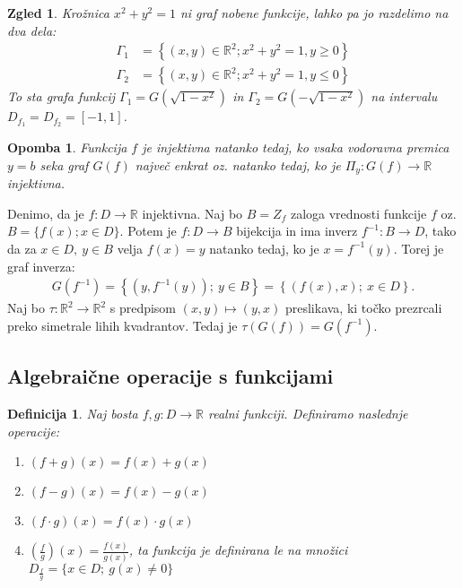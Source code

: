 \documentclass[10pt, a4paper]{article}
\newtheorem{defi}{Definicija}[section]
\newenvironment{noticeB}{%
  \tcolorbox[%
  notitle,
  empty,
  enhanced,  %
  breakable,
  coltext=black,
  colback=white, 
  fontupper=\rmfamily,
  parbox=false,
  noparskip,
  sharp corners,
  boxrule=-1pt,  %
  frame hidden,
  left=7pt,  %
  right=7pt,
  top=5pt,
  bottom=5pt,
  before skip=2.5ex plus 2pt,
  after skip=2.5ex plus 2pt,
  borderline west = {1.5pt}{-0.1pt}{blue!30!black}, %
  overlay unbroken and last={%
    \draw[color=black, line width=1.25pt]
    ($(frame.south west)+(1.pt, -0.1pt)$) -- ++(2em, 0);
  }
  ]}
{\endtcolorbox}
\newenvironment{definicija}{\begin{defi}\begin{noticeB}}{%
    \end{noticeB}\end{defi}}
\newtheorem*{opomba}{Opomba}
\newtheorem{zgled}{Zgled}[section]
\newcommand{\R}{\mathbb {R}}
\begin{document}
\begin{zgled}
    Krožnica $x^2 + y^2 = 1$ ni graf nobene funkcije, lahko pa jo razdelimo na dva dela:
    \begin{align*}
        \Gamma_1 &= \left\lbrace (x,y)\in \R^2; x^2 + y^2 = 1, y \geq 0 \right\rbrace\\
        \Gamma_2 &= \left\lbrace (x,y)\in \R^2; x^2 + y^2 = 1, y \leq 0 \right\rbrace
    \end{align*}
    To sta grafa funkcij $\Gamma_1 = G \left( \sqrt{1-x^2} \right)$ in $\Gamma_2 = G \left( -\sqrt{1-x^2} \right)$ na intervalu $D_{f_1} = D_{f_2} = [-1,1]$.
\end{zgled}

\begin{opomba}
    Funkcija $f$ je injektivna natanko tedaj, ko vsaka vodoravna premica $y=b$ seka graf $G(f)$ največ enkrat oz. natanko tedaj, ko je
    $\Pi_y: G(f) \rightarrow\R$ injektivna.
\end{opomba}

Denimo, da je $f:D \rightarrow \R$ injektivna. Naj bo $B = Z_f$ zaloga vrednosti funkcije $f$ oz.
$B=\{f(x); x \in D\}.$ Potem je $f: D \rightarrow B$ bijekcija in ima inverz $f^{-1} : B \rightarrow D$, tako da za $x \in D,\ y \in B$ velja
$f(x) = y$ natanko tedaj, ko je $x = f^{-1}(y).$
Torej je graf inverza:
\begin{align*}
    G(f^{-1}) = \left\lbrace (y, f^{-1}(y));\ y \in B \right\rbrace
    = \left\lbrace (f(x), x);\ x \in D \right\rbrace.
\end{align*}
Naj bo $\tau: \R^2 \rightarrow \R^2$ s predpisom $(x,y) \mapsto (y,x)$
preslikava, ki točko prezrcali preko simetrale lihih kvadrantov. Tedaj je
$\tau (G(f)) = G(f^{-1}).$

\subsection{Algebraične operacije s funkcijami}

\begin{definicija}
    Naj bosta $f,g: D \rightarrow \R$ realni funkciji.
    Definiramo naslednje operacije:
    \begin{enumerate}
        \item $(f+g)(x) = f(x) + g(x)$
        \item $(f-g)(x) = f(x) - g(x)$
        \item $(f \cdot g)(x) = f(x) \cdot g(x)$
        \item $(\frac{f}{g})(x) = \frac{f(x)}{g(x)}$, ta funkcija je definirana le na množici $D_{\frac{f}{g}} = \{x \in D;\ g(x) \neq 0\}$
    \end{enumerate}
\end{definicija}
\end{document}
